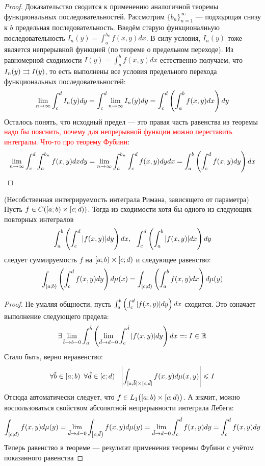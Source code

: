 \begin{proof}
	Доказательство сводится к применению аналогичной теоремы функциональных последовательностей. Рассмотрим $\{b_n\}_{n = 1}^\infty$ --- подходящая снизу к $b$ предельная последовательность. Введём старую функционалньую последовательность $I_n(y) = \int_a^{b_n} f(x, y)dx$. В силу условия,  $I_n(y)$ тоже является непрерывной функцией (по теореме о предельном переходе). Из равномерной сходимости $I(y) = \int_a^b f(x, y)dx$ естественно получаем, что $I_n(y) \rightrightarrows I(y)$, то есть выполнены все условия предельного перехода функциональных последовательностей:
	\[
		\lim_{n \to \infty} \int_c^d I_n(y)dy = \int_c^d \lim_{n \to \infty} I_n(y)dy = \int_c^d \left(\int_a^b f(x, y)dx\right)dy
	\]
	Осталось понять, что исходный предел --- это правая часть равенства из теоремы \textcolor{red}{надо бы пояснить, почему для непрерывной функции можно переставить интегралы. Что-то про теорему Фубини}:
	\[
		\lim_{n \to \infty} \int_c^d \int_a^{b_n} f(x, y)dxdy = \lim_{n \to \infty} \int_a^{b_n} \int_c^d f(x, y)dydx = \int_a^b \left(\int_c^d f(x, y)dy\right)dx
	\]
\end{proof}

\begin{theorem} (Несобственная интегрируемость интеграла Римана, зависящего от параметра)
	Пусть $f \in C(\left[a; b\right) \times \left[c; d\right))$. Тогда из сходимости хотя бы одного из следующих повторных интегралов
	\[
		\int_a^b \left(\int_c^d |f(x, y)|dy\right)dx,\ \ \int_c^d \left(\int_a^b |f(x, y)|dx\right)dy
	\]
	следует суммируемость $f$ на $\left[a; b\right) \times \left[c; d\right)$ и следующее равенство:
	\[
		\int_{\left[a; b\right)} \left(\int_c^d f(x, y)dy\right)d\mu(x) = \int_{\left[c; d\right)} \left(\int_a^b f(x, y)dx\right)d\mu(y)
	\]
\end{theorem}

\begin{proof}
	Не умаляя общности, пусть $\int_a^b \left(\int_c^d |f(x, y)|dy\right)dx$ сходится. Это означает выполнение следующего предела:
	\[
		\exists \lim_{\tilde{b} \to b-0} \int_a^{\tilde{b}} \left(\lim_{\tilde{d} \to d-0} \int_c^{\tilde{d}} |f(x, y)|dy\right)dx =: I \in \mathbb{R}
	\]
	Стало быть, верно неравенство:
	\[
		\forall \tilde{b} \in \left[a; b\right)\ \forall \tilde{d} \in \left[c; d\right)\ \ \left|\int_{[a; \tilde{b}] \times [c; \tilde{d}]} f(x, y)d\mu(x, y)\right| \leqslant I
	\]
	Отсюда автоматически следует, что $f \in L_1\big(\!\left[a; b\right) \times \left[c; d\right)\!\big)$. А значит, можно воспользоваться свойством абсолютной непрерывности интеграла Лебега:
	\[
		\int_{\left[c; d\right)} f(x, y)d\mu(y) = \lim_{\tilde{d} \to d-0} \int_{\left[c; \tilde{d}\right)} f(x, y)d\mu(y) = \lim_{\tilde{d} \to d-0} \int_c^{\tilde{d}} f(x, y)dy = \int_c^d f(x, y)dy
	\]
	Теперь равенство в теореме --- результат применения теоремы Фубини с учётом показанного равенства
\end{proof}

